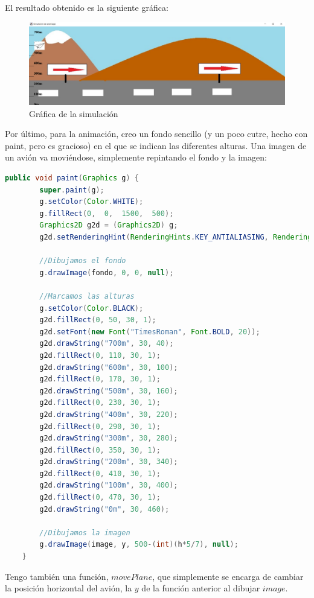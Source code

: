 \documentclass[
]{article}
\begin{document}
El resultado obtenido es la siguiente gráfica:

\begin{figure}
\centering
\includegraphics{pegado6.png}
\caption{Gráfica de la simulación}
\end{figure}

Por último, para la animación, creo un fondo sencillo (y un poco cutre,
hecho con paint, pero es gracioso) en el que se indican las diferentes
alturas. Una imagen de un avión va moviéndose, simplemente repintando el
fondo y la imagen:

\begin{lstlisting}[language=Java, caption=Dibujamos el fondo y la imagen]
  public void paint(Graphics g) {
        super.paint(g);
        g.setColor(Color.WHITE);
        g.fillRect(0,  0,  1500,  500);
        Graphics2D g2d = (Graphics2D) g;
        g2d.setRenderingHint(RenderingHints.KEY_ANTIALIASING, RenderingHints.VALUE_ANTIALIAS_ON);
        
        //Dibujamos el fondo
        g.drawImage(fondo, 0, 0, null);
        
        //Marcamos las alturas
        g.setColor(Color.BLACK);
        g2d.fillRect(0, 50, 30, 1);
        g2d.setFont(new Font("TimesRoman", Font.BOLD, 20));
        g2d.drawString("700m", 30, 40);
        g2d.fillRect(0, 110, 30, 1);
        g2d.drawString("600m", 30, 100);
        g2d.fillRect(0, 170, 30, 1);
        g2d.drawString("500m", 30, 160);
        g2d.fillRect(0, 230, 30, 1);
        g2d.drawString("400m", 30, 220);
        g2d.fillRect(0, 290, 30, 1);
        g2d.drawString("300m", 30, 280);
        g2d.fillRect(0, 350, 30, 1);
        g2d.drawString("200m", 30, 340);
        g2d.fillRect(0, 410, 30, 1);
        g2d.drawString("100m", 30, 400);
        g2d.fillRect(0, 470, 30, 1);
        g2d.drawString("0m", 30, 460);
        
        //Dibujamos la imagen
        g.drawImage(image, y, 500-(int)(h*5/7), null);
    }
\end{lstlisting}

Tengo también una función, \(movePlane\), que simplemente se encarga de
cambiar la posición horizontal del avión, la \(y\) de la función
anterior al dibujar \(image\).
\end{document}
